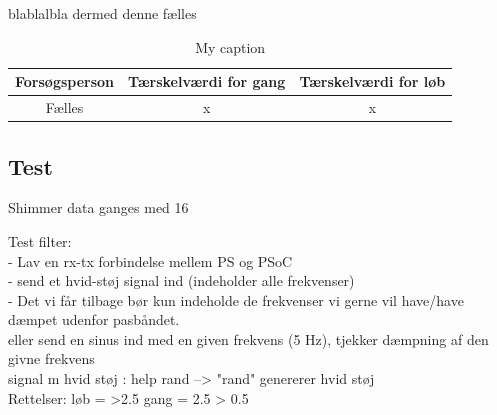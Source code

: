 blablalbla 
dermed denne fælles

\begin{table}[H]
	\centering
	\begin{tabular}{@{}ccc@{}}
		\toprule
		\rowcolor[HTML]{C0C0C0} 
		Forsøgsperson & Tærskelværdi for gang & Tærskelværdi for løb \\ \midrule
		Fælles & x & x \\ \bottomrule
	\end{tabular}
	\caption{My caption}
	\label{tab:faelles_taerskel}
\end{table}


\subsection{Test}

Shimmer data ganges med 16


Test filter:\\
- Lav en rx-tx forbindelse mellem PS og PSoC\\
- send et hvid-støj signal ind (indeholder alle frekvenser)\\
- Det vi får tilbage bør kun indeholde de frekvenser vi gerne vil have/have dæmpet udenfor pasbåndet. \\

eller send en sinus ind med en given frekvens (5 Hz), tjekker dæmpning af den givne frekvens\\

signal m hvid støj : help rand --> "rand" genererer hvid støj\\












Rettelser:
løb = >2.5
gang = 2.5 > 0.5
